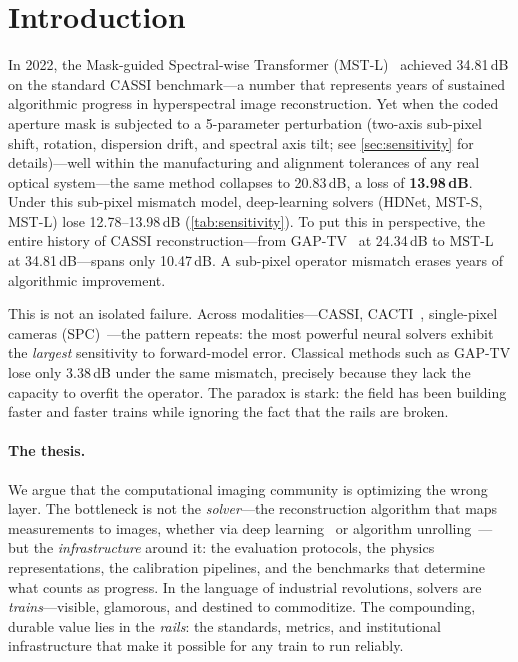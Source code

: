 
\section{Introduction}
\label{sec:intro}


In 2022, the Mask-guided Spectral-wise Transformer (MST-L)~\cite{cai2022mst}
achieved 34.81\,dB on the standard CASSI benchmark---a number that
represents years of sustained algorithmic progress in
hyperspectral image reconstruction.
Yet when the coded aperture mask is subjected to a 5-parameter
perturbation (two-axis sub-pixel shift, rotation, dispersion drift, and spectral
axis tilt; see \cref{sec:sensitivity} for details)---well
within the manufacturing and alignment tolerances of any real optical
system---the same method collapses to 20.83\,dB, a loss of
\textbf{13.98\,dB}.
Under this sub-pixel mismatch model, deep-learning solvers (HDNet, MST-S, MST-L) lose
12.78--13.98\,dB (\cref{tab:sensitivity}).
To put this in perspective, the entire history of
CASSI reconstruction---from GAP-TV~\cite{yuan2016gaptv} at 24.34\,dB to MST-L~\cite{cai2022mst} at 34.81\,dB---spans only 10.47\,dB.
A sub-pixel operator mismatch erases years of
algorithmic improvement.

This is not an isolated failure.
Across modalities---CASSI,
CACTI~\cite{llull2013cacti}, single-pixel
cameras (SPC)~\cite{duarte2008spc}---the pattern repeats: the most powerful neural solvers
exhibit the \emph{largest} sensitivity to forward-model error.
Classical methods such as GAP-TV lose only 3.38\,dB under the same
mismatch, precisely because they lack the capacity to overfit the
operator.
The paradox is stark: the field has been building faster and faster
trains while ignoring the fact that the rails are broken.


\paragraph{The thesis.}
We argue that the computational imaging community is optimizing the
wrong layer.
The bottleneck is not the \emph{solver}---the reconstruction algorithm
that maps measurements to images, whether via deep learning~\cite{ongie2020deep}
or algorithm unrolling~\cite{monga2021unrolling}---but the \emph{infrastructure} around
it: the evaluation protocols, the physics representations, the
calibration pipelines, and the benchmarks that determine what counts as
progress.
In the language of industrial revolutions, solvers are
\emph{trains}---visible, glamorous, and destined to commoditize.
The compounding, durable value lies in the \emph{rails}: the standards,
metrics, and institutional infrastructure that make it possible for any
train to run reliably.

